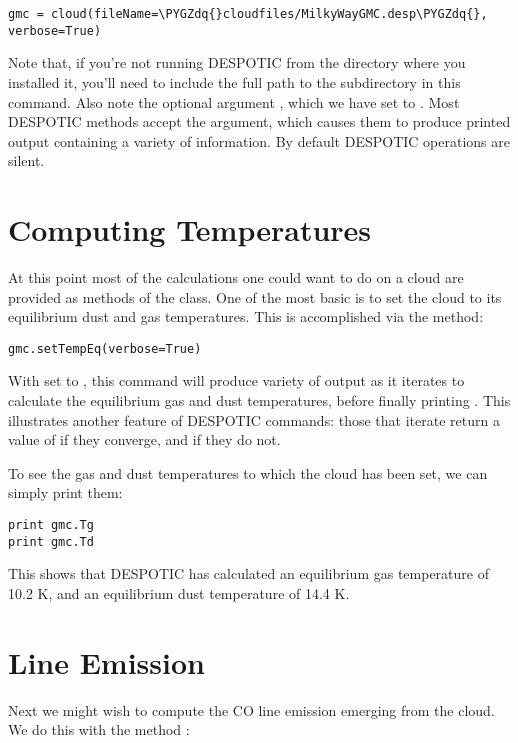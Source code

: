 \documentclass[letterpaper,10pt,english]{sphinxmanual}
\def\PYGZdq{\char`\"}
\begin{document}
\begin{Verbatim}[commandchars=\\\{\}]
gmc = cloud(fileName=\PYGZdq{}cloudfiles/MilkyWayGMC.desp\PYGZdq{}, verbose=True)
\end{Verbatim}

Note that, if you're not running DESPOTIC from the directory where you
installed it, you'll need to include the full path to the 
subdirectory in this command. Also note the optional argument
, which we have set to . Most DESPOTIC methods
accept the  argument, which causes them to produce printed
output containing a variety of information. By default DESPOTIC
operations are silent.


\section{Computing Temperatures}
\label{quickstart:computing-temperatures}
At this point most of the calculations one could want to do on a cloud
are provided as methods of the  class. One of the most basic is
to set the cloud to its equilibrium dust and gas temperatures. This is
accomplished via the  method:

\begin{Verbatim}[commandchars=\\\{\}]
gmc.setTempEq(verbose=True)
\end{Verbatim}

With  set to , this command will produce variety of
output as it iterates to calculate the equilibrium gas and dust
temperatures, before finally printing . This illustrates
another feature of DESPOTIC commands: those that iterate return a
value of  if they converge, and  if they do not.

To see the gas and dust temperatures to which the cloud has been set,
we can simply print them:

\begin{Verbatim}[commandchars=\\\{\}]
print gmc.Tg
print gmc.Td
\end{Verbatim}

This shows that DESPOTIC has calculated an equilibrium gas temperature
of 10.2 K, and an equilibrium dust temperature of 14.4 K.


\section{Line Emission}
\label{quickstart:line-emission}
Next we might wish to compute the CO line emission emerging from the
cloud. We do this with the  method :
\end{document}
